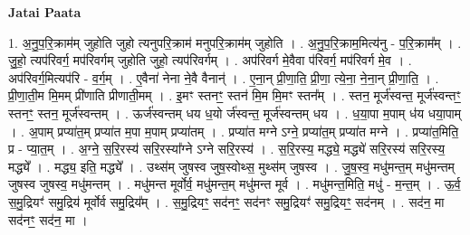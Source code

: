 \documentclass[17pt]{extarticle}
\begin{document}
\textbf{Jatai Paata} \newline

1. अ॒नु॒प॒रि॒क्राम॑म् जुहोति जुहो त्यनुपरि॒क्राम॑ मनुपरि॒क्राम॑म् जुहोति । . अ॒नु॒प॒रि॒क्राम॒मित्य॑नु - प॒रि॒क्राम᳚म् । . जु॒हो॒ त्यप॑रिवर्ग॒ मप॑रिवर्गम् जुहोति जुहो॒ त्यप॑रिवर्गम् । . अप॑रिवर्ग मे॒वैवा प॑रिवर्ग॒ मप॑रिवर्ग मे॒व । . अप॑रिवर्ग॒मित्यप॑रि - व॒र्ग॒म् । . ए॒वैना॑ नेना ने॒वै वैनान्॑ । . ए॒ना॒न् प्री॒णा॒ति॒ प्री॒णा॒ त्ये॒ना॒ ने॒ना॒न् प्री॒णा॒ति॒ । . प्री॒णा॒ती॒म मि॒मम् प्री॑णाति प्रीणाती॒मम् । . इ॒मꣳ स्तनꣳ॒॒ स्तन॑ मि॒म मि॒मꣳ स्तन᳚म् । . स्तन॒ मूर्ज॑स्वन्त॒ मूर्ज॑स्वन्तꣳ॒॒ स्तनꣳ॒॒ स्तन॒ मूर्ज॑स्वन्तम् । . ऊर्ज॑स्वन्तम् धय ध॒यो र्ज॑स्वन्त॒ मूर्ज॑स्वन्तम् धय । . ध॒या॒पा म॒पाम् ध॑य धया॒पाम् । . अ॒पाम् प्रप्या॑त॒म् प्रप्या॑त म॒पा म॒पाम् प्रप्या॑तम् । . प्रप्या॑त मग्ने ऽग्ने॒ प्रप्या॑त॒म् प्रप्या॑त मग्ने । . प्रप्या॑त॒मिति॒ प्र - प्या॒त॒म् । . अ॒ग्ने॒ स॒रि॒रस्य॑ सरि॒रस्या᳚ग्ने ऽग्ने सरि॒रस्य॑ । . स॒रि॒रस्य॒ मद्ध्ये॒ मद्ध्ये॑ सरि॒रस्य॑ सरि॒रस्य॒ मद्ध्ये᳚ । . मद्ध्य॒ इति॒ मद्ध्ये᳚ । . उथ्स॑म् जुषस्व जुष॒स्वोथ्स॒ मुथ्स॑म् जुषस्व । . जु॒ष॒स्व॒ मधु॑मन्त॒म् मधु॑मन्तम् जुषस्व जुषस्व॒ मधु॑मन्तम् । . मधु॑मन्त मूर्वोर्व॒ मधु॑मन्त॒म् मधु॑मन्त मूर्व । . मधु॑मन्त॒मिति॒ मधु॑ - म॒न्त॒म् । . ऊ॒र्व॒ स॒मु॒द्रियꣳ॑ समु॒द्रिय॑ मूर्वोर्व समु॒द्रिय᳚म् । . स॒मु॒द्रियꣳ॒॒ सद॑नꣳ॒॒ सद॑नꣳ समु॒द्रियꣳ॑ समु॒द्रियꣳ॒॒ सद॑नम् । . सद॑न॒ मा सद॑नꣳ॒॒ सद॑न॒ मा । \newline
\end{document}
